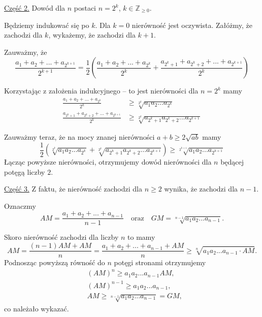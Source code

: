 \noindent
\underline{Część 2.} Dowód dla $n$ postaci $n = 2^k$, $k \in \mathbb{Z}_{\geqslant 0}$.

\vspace{10px}

\noindent
Będziemy indukować się po $k$. Dla $k = 0$ nierówność jest oczywista. Załóżmy, że zachodzi dla $k$, wykażemy, że zachodzi dla $k + 1$.

\noindent
Zauważmy, że
\[
    \frac{a_1 + a_2 + ... + a_{2^{k + 1}}}{2^{k + 1}} = \frac{1}{2}\left( \frac{a_1 + a_2 + ... + a_{2^{k}}}{2^{k}} + \frac{a_{2^k + 1} + a_{2^k + 2} + ... + a_{2^{k + 1}}}{2^{k}}\right)
\]

\noindent
Korzystając z założenia indukcyjnego -- to jest nierówności dla $n = 2^{k}$ mamy
\begin{align*}
    \frac{a_1 + a_2 + ... + a_{2^{k}}}{2^{k}} &\geqslant \sqrt[2^k]{a_1a_2...a_{2^k}} \\
   \frac{a_{2^k + 1} + a_{2^k + 2} + ... + a_{2^{k + 1}}}{2^{k}} &\geqslant \sqrt[2^k]{a_{2^k + 1}a_{2^k + 2}...a_{2^{k + 1}}}
\end{align*}

\noindent
Zauważmy teraz, że na mocy znanej nierówności $a + b \geqslant 2\sqrt{ab}$ mamy
\[
    \frac{1}{2}\left(\sqrt[2^k]{a_1a_2...a_{2^k}} + \sqrt[2^k]{a_{2^k + 1}a_{2^k + 2}...a_{2^{k + 1}}}\right) \geqslant \sqrt[2^{k + 1}]{a_1a_2...a_{2^{k + 1}}}
\]
Łącząc powyższe nierówności, otrzymujemy dowód nierówności dla $n$ będącej potęgą liczby $2$.

\vspace{10px}

\noindent
\underline{Część 3.} Z faktu, że nierówność zachodzi dla $n \geqslant 2$ wynika, że zachodzi dla $n - 1$.

\vspace{10px}

\noindent
Oznaczmy 
\[
    AM = \frac{a_1 + a_2 + ... + a_{n - 1}}{n - 1} \quad \text{oraz} \quad GM = \sqrt[n - 1]{a_1a_2...a_{n - 1}}.
\]

\noindent
Skoro nierówność zachodzi dla liczby $n$ to mamy
\[
    AM = \frac{(n-1)AM + AM}{n} = \frac{a_1 + a_2 + ... + a_{n - 1} + AM}{n} \geqslant \sqrt[n]{a_1a_2...a_{n - 1}\cdot AM}.
\]
Podnosząc powyższą równość do $n$ potęgi stronami otrzymujemy
\begin{align*}
    &(AM)^n \geqslant a_1a_2...a_{n-1}AM, \\
    &(AM)^{n - 1} \geqslant a_1a_2...a_{n-1}, \\
    &AM \geqslant \sqrt[n - 1]{a_1a_2...a_{n-1}} = GM,
\end{align*}
co należało wykazać.

